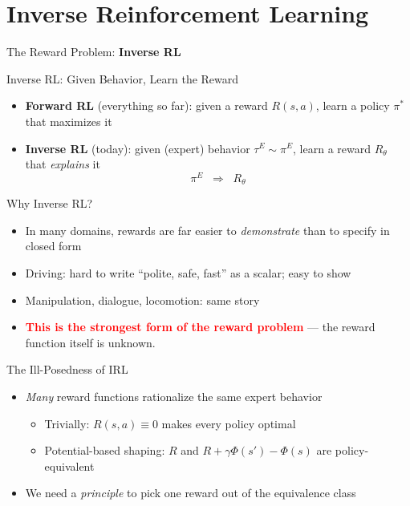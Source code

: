 \section{Inverse Reinforcement Learning}

\begin{frame}{}
    \LARGE The Reward Problem: \textbf{Inverse RL}
\end{frame}

\begin{frame}{Inverse RL: Given Behavior, Learn the Reward}
\begin{itemize}
    \setlength{\itemsep}{0.6em}
    \item \textbf{Forward RL} (everything so far): given a reward $R(s,a)$, learn a policy $\pi^*$ that maximizes it
    \item \textbf{Inverse RL} (today): given (expert) behavior $\tau^E \sim \pi^E$, learn a reward $R_\theta$ that \emph{explains} it
    \[
        \pi^E \;\;\Longrightarrow\;\; R_\theta
    \]
\end{itemize}
\end{frame}

\begin{frame}{Why Inverse RL?}
\begin{itemize}
    \setlength{\itemsep}{0.65em}
    \item In many domains, rewards are far easier to \emph{demonstrate} than to specify in closed form
    \item Driving: hard to write ``polite, safe, fast'' as a scalar; easy to show
    \item Manipulation, dialogue, locomotion: same story
    \item \textcolor{red}{\textbf{This is the strongest form of the reward problem}} --- the reward function itself is unknown.
\end{itemize}
\end{frame}

\begin{frame}{The Ill-Posedness of IRL}
\begin{itemize}
    \setlength{\itemsep}{0.6em}
    \item \emph{Many} reward functions rationalize the same expert behavior
    \begin{itemize}
        \item Trivially: $R(s,a) \equiv 0$ makes every policy optimal
        \item Potential-based shaping: $R$ and $R + \gamma\Phi(s') - \Phi(s)$ are policy-equivalent
    \end{itemize}
    \item We need a \emph{principle} to pick one reward out of the equivalence class
\end{itemize}
\end{frame}

